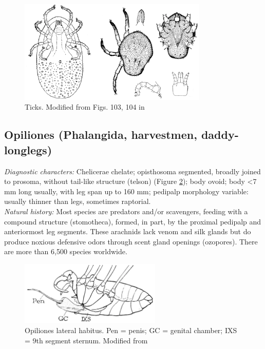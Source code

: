 \documentclass[letterpaper, 11pt]{article}
\begin{document}
\begin{figure}[ht!]
  \centering
    \includegraphics[width=0.8\textwidth]{ixodid103104.png}
  \caption{Ticks. Modified from Figs. 103, 104 in \cite{bhlitem132773acari}}
  \label{fig:ixodid}
\end{figure}

\subsection{Opiliones (Phalangida, harvestmen, daddy-longlegs)}
\noindent{}\textit{Diagnostic characters:} Chelicerae chelate; opisthosoma segmented, broadly joined to prosoma, without tail-like structure (telson) (Figure \ref{fig:opiliones1}); body ovoid; body  \textless7 mm long usually, with leg span up to 160 mm; pedipalp morphology variable: usually thinner than legs, sometimes raptorial.\\

\noindent{}\textit{Natural history:} Most species are predators and/or scavengers, feeding with a compound structure (stomotheca), formed, in part, by the proximal pedipalp and anteriormost leg segments. These arachnids lack venom and silk glands but do produce noxious defensive odors through scent gland openings (ozopores). There are more than 6,500 species worldwide. \\

\begin{figure}[ht!]
  \centering
    \includegraphics[width=0.6\textwidth]{opilion12C.png}
  \caption{Opiliones lateral habitus. Pen = penis; GC = genital chamber; IXS = 9th segment sternum.  Modified from \cite{snodgrass1937morphology}}
  \label{fig:opiliones1}
\end{figure}
\end{document}
